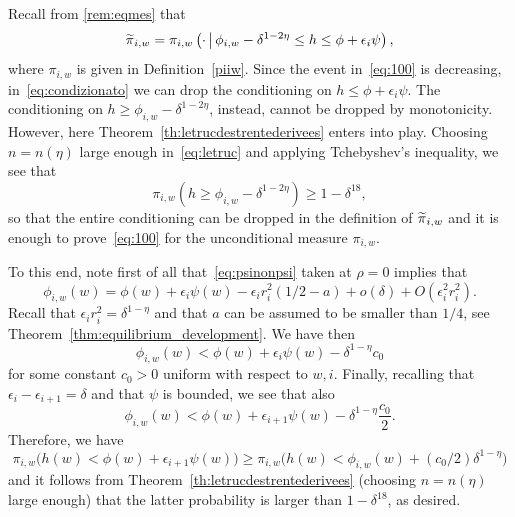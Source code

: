 \documentclass[10pt]{amsart}
\theoremstyle{definition}\newtheorem{defi}[theo]{Definition}\newtheorem{rema}[theo]{Remark}\newtheorem{exam}[theo]{Example}\newtheorem{exem}[theo]{Example}\newtheorem{nota}[theo]{Notation}
\newcommand{\eps}{\epsilon}
\let\oldtilde\tilde
\renewcommand*{\tilde}[1]{\mathchoice{\widetilde{#1}}{\widetilde{#1}}{\oldtilde{#1}}{\oldtilde{#1}}}
\begin{document}
Recall from \cref{rem:eqmes} that
\begin{equation}\label{eq:condizionato}
\tilde\pi_{i,w}=\pi_{i,w}\left(\cdot\,\middle|\,\phi_{i,w}-\delta^{1-2\eta}\le h\le \phi+\epsilon_i\psi\right),
\end{equation}
where $\pi_{i,w}$ is given in Definition~\ref{piiw}. Since the event in~\eqref{eq:100} is decreasing, in~\eqref{eq:condizionato} we can drop the conditioning on $h\le \phi+\epsilon_i\psi$. The conditioning on $h\ge \phi_{i,w}-\delta^{1-2\eta}$, instead, cannot be dropped by monotonicity. However, here Theorem~\ref{th:letrucdestrentederivees} enters into play. Choosing $n=n(\eta)$ large enough in~\eqref{eq:letruc} and applying Tchebyshev's inequality, we see that
\begin{equation}
\pi_{i,w}\left(h\ge \phi_{i,w}-\delta^{1-2\eta}\right)\ge 1-\delta^{18},
\end{equation}
so that the entire conditioning can be dropped in the definition of $\tilde\pi_{i,w}$ and it is enough to prove~\eqref{eq:100} for the unconditional measure $\pi_{i,w}$.

To this end, note first of all that~\eqref{eq:psinonpsi} taken at $\rho=0$ implies that
\begin{equation}
\phi_{i,w}(w)= \phi(w)+\epsilon_i\psi(w)-\epsilon_ir_i^2 (1/2-a)+o(\delta)+O\left(\epsilon_i^2r_i^2\right).
\end{equation}
Recall that $\epsilon_ir_i^2=\delta^{1-\eta}$ and that $a$ can be assumed to be smaller than $1/4$, see Theorem~\ref{thm:equilibrium_development}. We have then
\begin{equation}
\phi_{i,w}(w)< \phi(w)+\epsilon_i\psi(w)-\delta^{1-\eta} c_0
\end{equation}
for some constant $c_0>0$ uniform with respect to $w,i$. Finally, recalling that $\epsilon_i-\epsilon_{i+1}=\delta$ and that $\psi$ is bounded, we see that also
\begin{equation}
\phi_{i,w}(w)< \phi(w)+\epsilon_{i+1}\psi(w)-\delta^{1-\eta} \frac{c_0}2.
\end{equation}
Therefore, we have
\begin{equation}
\pi_{i,w}\big(h(w) < \phi(w) + \eps_{i+1} \psi(w) \big)\ge
\pi_{i,w}\big(h(w) < \phi_{i,w}(w)+(c_0/2)\delta^{1-\eta} \big)
\end{equation}
and it follows from Theorem~\ref{th:letrucdestrentederivees} (choosing $n=n(\eta)$ large enough) that the latter probability is larger than $1-\delta^{18}$, as desired.
\end{document}
